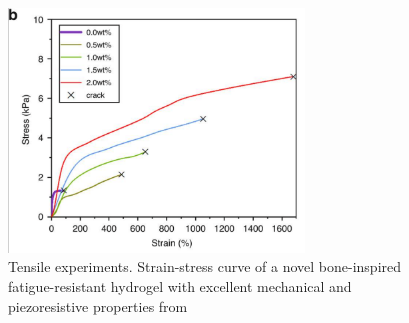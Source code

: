 \begin{figure}[ht!]
    \centering
    \includegraphics[width=0.7\textwidth]{figs/mechResponse/mech_response1.png}
    \caption{Tensile experiments. Strain-stress curve  of a novel bone-inspired fatigue-resistant hydrogel with excellent mechanical and piezoresistive properties from\citep{lyuBoneinspiredGNECHAPAAm2023}}
\end{figure}

